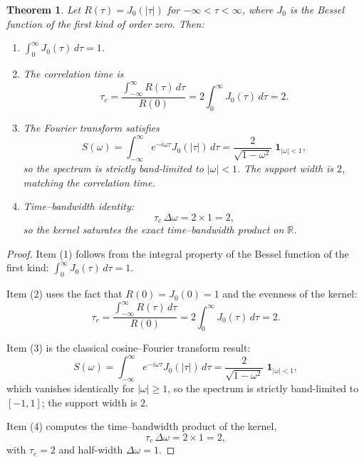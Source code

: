 \documentclass{article}
\begin{document}
\theoremstyle{plain}
\newtheorem{theorem}{Theorem}

\begin{theorem}
Let \( R(\tau) = J_0(|\tau|) \) for \( -\infty < \tau < \infty \), where \( J_0 \) is the Bessel function of the first kind of order zero. Then:
\begin{enumerate}
    \item \(
        \displaystyle
        \int_{0}^{\infty}J_{0}(\tau)\,d\tau = 1
        \).
    \item The correlation time is
        \[
            \tau_{c}
            =\frac{\displaystyle\int_{-\infty}^{\infty}R(\tau)\,d\tau}{R(0)}
            =2\!\int_{0}^{\infty}J_{0}(\tau)\,d\tau
            =2.
        \]
    \item The Fourier transform satisfies
        \[
            S(\omega)=\int_{-\infty}^{\infty}\!e^{-i\omega\tau}J_{0}(|\tau|)\,d\tau
            =\frac{2}{\sqrt{1-\omega^{2}}}\;\mathbf 1_{|\omega|<1},
        \]
        so the spectrum is strictly band-limited to \( |\omega| < 1 \). The support width is \(2\), matching the correlation time.
    \item Time–bandwidth identity:
        \[
            \tau_{c}\,\Delta\omega = 2\times1=2,
        \]
        so the kernel saturates the exact time–bandwidth product on \(\mathbb{R}\).
\end{enumerate}
\end{theorem}

\begin{proof}
Item (1) follows from the integral property of the Bessel function of the first kind: \( \int_{0}^{\infty}J_{0}(\tau)\,d\tau = 1 \).

Item (2) uses the fact that \( R(0)=J_{0}(0)=1 \) and the evenness of the kernel:
\[
\tau_{c}
   =\frac{\displaystyle\int_{-\infty}^{\infty}R(\tau)\,d\tau}{R(0)}
   =2\!\int_{0}^{\infty}J_{0}(\tau)\,d\tau
   =2.
\]

Item (3) is the classical cosine–Fourier transform result:
\[
S(\omega)=\int_{-\infty}^{\infty}\!e^{-i\omega\tau}J_{0}(|\tau|)\,d\tau
         =\frac{2}{\sqrt{1-\omega^{2}}}\;\mathbf 1_{|\omega|<1},
\]
which vanishes identically for \( |\omega|\ge 1 \), so the spectrum is strictly band-limited to \( [-1,1] \); the support width is \(2\).

Item (4) computes the time–bandwidth product of the kernel,
\[
\tau_{c}\,\Delta\omega = 2\times1=2,
\]
with \( \tau_c=2 \) and half-width \( \Delta\omega=1 \).
\end{proof}
\end{document}
